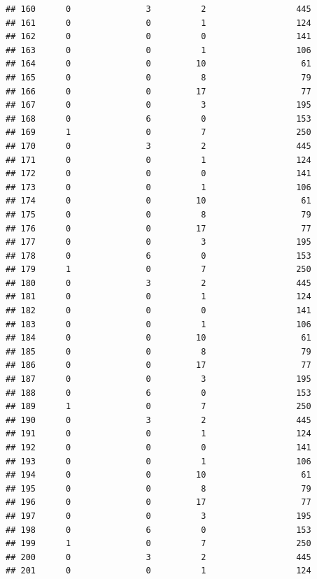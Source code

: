 \documentclass[
]{article}
\begin{document}
\begin{verbatim}
## 160      0               3          2                  445
## 161      0               0          1                  124
## 162      0               0          0                  141
## 163      0               0          1                  106
## 164      0               0         10                   61
## 165      0               0          8                   79
## 166      0               0         17                   77
## 167      0               0          3                  195
## 168      0               6          0                  153
## 169      1               0          7                  250
## 170      0               3          2                  445
## 171      0               0          1                  124
## 172      0               0          0                  141
## 173      0               0          1                  106
## 174      0               0         10                   61
## 175      0               0          8                   79
## 176      0               0         17                   77
## 177      0               0          3                  195
## 178      0               6          0                  153
## 179      1               0          7                  250
## 180      0               3          2                  445
## 181      0               0          1                  124
## 182      0               0          0                  141
## 183      0               0          1                  106
## 184      0               0         10                   61
## 185      0               0          8                   79
## 186      0               0         17                   77
## 187      0               0          3                  195
## 188      0               6          0                  153
## 189      1               0          7                  250
## 190      0               3          2                  445
## 191      0               0          1                  124
## 192      0               0          0                  141
## 193      0               0          1                  106
## 194      0               0         10                   61
## 195      0               0          8                   79
## 196      0               0         17                   77
## 197      0               0          3                  195
## 198      0               6          0                  153
## 199      1               0          7                  250
## 200      0               3          2                  445
## 201      0               0          1                  124

\end{verbatim}
\end{document}
